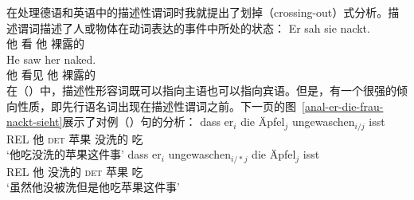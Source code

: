 在处理德语和英语中的描述性谓词时我就提出了划掉（crossing-out）式分析\citep{Mueller2004c,Mueller2008a}。描述谓词描述了人或物体在动词表达的事件中所处的状态：
\eal
\ex 
\gll Er sah sie nackt.\footnotemark\\
	他 看 他 裸露的\\
\ex 
\gll He saw her naked.\\
	他 看见 他 裸露的\\
\zl
在（）中，描述性形容词既可以指向主语也可以指向宾语。但是，有一个很强的倾向性质，即先行语名词出现在描述性谓词之前\citep[]{Loetscher85}。下一页的图~\vref{anal-er-die-frau-nackt-sieht}展示了对例（）句的分析：
\eal
\ex 
\gll dass er$_i$ die Äpfel$_j$ ungewaschen$_{i/j}$ isst\\
	 REL 他 \textsc{det} 苹果 没洗的 吃\\
\glt `他吃没洗的苹果这件事'
\ex 
\gll dass er$_i$ ungewaschen$_{i/*j}$ die Äpfel$_j$ isst\\
	 REL 他 没洗的 \textsc{det} 苹果 吃\\
\glt `虽然他没被洗但是他吃苹果这件事'
\zl
